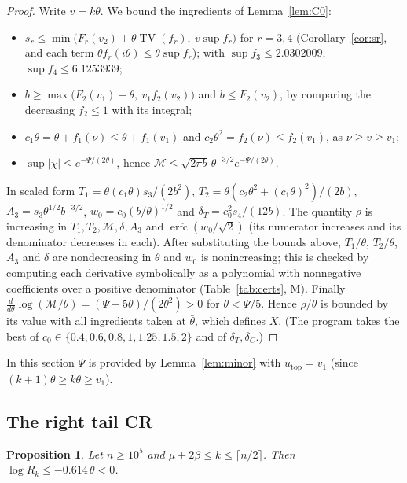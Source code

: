 \documentclass[11pt]{amsart}
\newtheorem{proposition}[theorem]{Proposition}
\theoremstyle{definition}
\theoremstyle{remark}
\numberwithin{equation}{section}
\newcommand{\TV}{\operatorname{TV}}
\newcommand{\erfc}{\operatorname{erfc}}
\begin{document}
\begin{proof}
Write $v=k\theta$. We bound the ingredients of Lemma~\ref{lem:C0}:
\begin{itemize}
\item $s_r\le\min\bigl(F_r(v_2)+\theta\TV(f_r),\ v\sup f_r\bigr)$ for $r=3,4$ (Corollary~\ref{cor:sr}, and each term $\theta f_r(i\theta)\le\theta\sup f_r$);
  with $\sup f_3\le2.0302009$, $\sup f_4\le6.1253939$;
\item $b\ge\max\bigl(F_2(v_1)-\theta,\ v_1f_2(v_2)\bigr)$ and $b\le F_2(v_2)$, by comparing the decreasing $f_2\le1$ with its integral;
\item $c_1\theta=\theta+f_1(\nu)\le\theta+f_1(v_1)$ and $c_2\theta^2=f_2(\nu)\le f_2(v_1)$, as $\nu\ge v\ge v_1$;
\item $\sup|\chi|\le e^{-\Psi/(2\theta)}$, hence $\mathcal M\le\sqrt{2\pi b}\,\theta^{-3/2}e^{-\Psi/(2\theta)}$.
\end{itemize}
In scaled form $T_1=\theta(c_1\theta)s_3/(2b^2)$, $T_2=\theta(c_2\theta^2+(c_1\theta)^2)/(2b)$, $A_3=s_3\theta^{1/2}b^{-3/2}$,
$w_0=c_0(b/\theta)^{1/2}$ and $\delta_T=c_0^2s_4/(12b)$. The quantity $\rho$ is increasing in $T_1,T_2,\mathcal M,\delta,A_3$ and
$\erfc(w_0/\sqrt2)$ (its numerator increases and its denominator decreases in each). After substituting the bounds above,
$T_1/\theta$, $T_2/\theta$, $A_3$ and $\delta$ are nondecreasing in $\theta$ and $w_0$ is nonincreasing; this is checked by computing
each derivative symbolically as a polynomial with nonnegative coefficients over a positive denominator (Table~\ref{tab:certs}, M).
Finally $\frac{d}{d\theta}\log(\mathcal M/\theta)=(\Psi-5\theta)/(2\theta^2)>0$ for $\theta<\Psi/5$. Hence $\rho/\theta$ is bounded by its
value with all ingredients taken at $\bar\theta$, which defines $X$. (The program takes the best of $c_0\in\{0.4,0.6,0.8,1,1.25,1.5,2\}$
and of $\delta_T,\delta_C$.)
\end{proof}

In this section $\Psi$ is provided by Lemma~\ref{lem:minor} with $u_{\mathrm{top}}=v_1$ (since $(k+1)\theta\ge k\theta\ge v_1$).

\subsection{The right tail CR}
\begin{proposition}\label{prop:CR}
Let $n\ge10^5$ and $\mu+2\beta\le k\le\lceil n/2\rceil$. Then $\log R_k\le-0.614\,\theta<0$.
\end{proposition}
\end{document}
